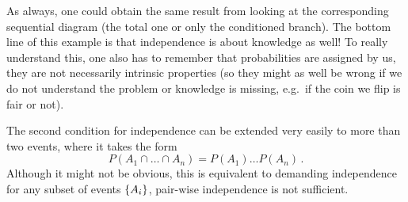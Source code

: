 \begin{ex}
As always, one could obtain the same result from looking at the corresponding sequential diagram (the total one or only the conditioned branch). The bottom line of this example is that independence is about knowledge as well! To really understand this, one also has to remember that probabilities are assigned by us, they are not necessarily intrinsic properties (so they might as well be wrong if we do not understand the problem or knowledge is missing, e.g.~if the coin we flip is fair or not).
\end{ex}


The second condition for independence can be extended very easily to more than two events, where it takes the form
\begin{equation}
P(A_1 \cap \dots \cap A_n) = P(A_1) \dots P(A_n) \, .
\end{equation}
Although it might not be obvious, this is equivalent to demanding independence for any subset of events $\qty{A_i}$, pair-wise independence is not sufficient.


